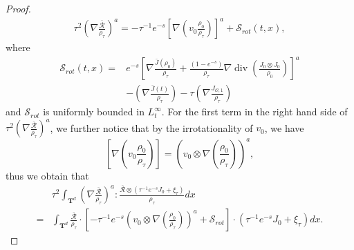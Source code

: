 \documentclass[10pt,a4paper]{amsart}
\def\T{{\mathbf T}}%
\DeclareMathOperator{\diver}{div}
\begin{document}
\begin{proof}
\begin{align*}
\tau^2 \left(\nabla\frac{\overline{\mathcal{R}}}{\rho_\tau}\right)^a
=-\tau^{-1} e^{-s}\left[\nabla\left(v_0\frac{\rho_0}{\rho_\tau}\right)\right]^a+\mathcal{S}_{rot}(t,x),
\end{align*}
where 
\begin{equation}\label{eq:S_curl}
\begin{aligned}
\mathcal{S}_{rot}(t,x)=&e^{-s}\left[\nabla\frac{\bar J(\rho_0)}{\rho_\tau}+\frac{(1-e^{-s})}{\rho_\tau}\nabla\diver\left(\frac{J_0\otimes J_0}{\rho_0}\right)\right]^a\\
&-\left(\nabla\frac{\bar J(t)}{\rho_\tau}\right)-\tau \left(\nabla\frac{J_{\mathcal{O},1}}{\rho_\tau}\right)
\end{aligned}
\end{equation}
and $\mathcal{S}_{rot}$ is uniformly bounded in $L^\infty_t$. For the first term in the right hand side of $\tau^2 \left(\nabla\frac{\overline{\mathcal{R}}}{\rho_\tau}\right)^a$, we further notice that by the irrotationality of $v_0$, we have
\[
\left[\nabla\left(v_0\frac{\rho_0}{\rho_\tau}\right)\right]=\left(v_0\otimes\nabla\left(\frac{\rho_0}{\rho_\tau}\right)\right)^a,
\]
thus we obtain that
\begin{align*}
&\tau^2\int_{\T^d} \left(\nabla\frac{\overline{\mathcal{R}}}{\rho_\tau}\right)^a:\frac{\overline{\mathcal{R}}\otimes(\tau^{-1}e^{-s}J_0+\xi_\tau)}{\rho_\tau}dx\\
=&\int_{\T^d}\frac{\overline{\mathcal{R}}}{\rho_\tau}\cdot\left[-\tau^{-1} e^{-s}\left(v_0\otimes\nabla\left(\frac{\rho_0}{\rho_\tau}\right)\right)^a+\mathcal{S}_{rot}\right]\cdot(\tau^{-1}e^{-s}J_0+\xi_\tau)dx.
\end{align*}



\end{proof}
\end{document}
